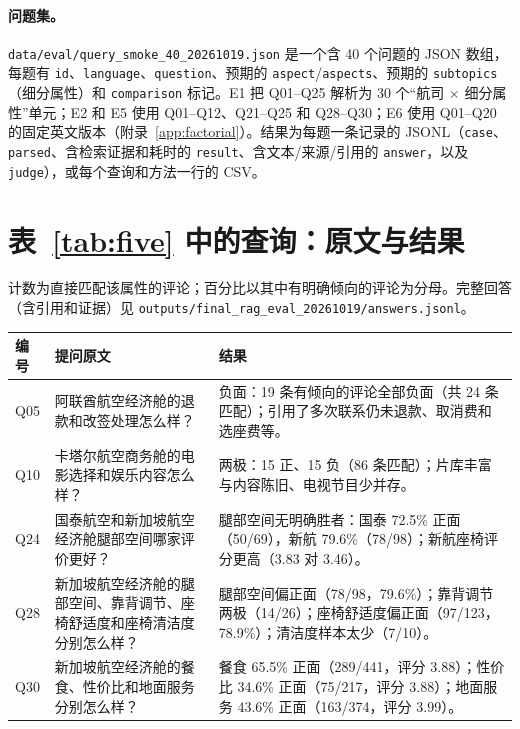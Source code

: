 \documentclass[10pt,twocolumn,a4paper]{article}
\begin{document}
\paragraph{问题集。}\nolinkurl{data/eval/query_smoke_40_20261019.json} 是一个含 40 个问题的 JSON 数组，每题有 \texttt{id}、\texttt{language}、\texttt{question}、预期的 \texttt{aspect}/\texttt{aspects}、预期的 \texttt{subtopics}（细分属性）和 \texttt{comparison} 标记。E1 把 Q01--Q25 解析为 30 个“航司 $\times$ 细分属性”单元；E2 和 E5 使用 Q01--Q12、Q21--Q25 和 Q28--Q30；E6 使用 Q01--Q20 的固定英文版本（附录~\ref{app:factorial}）。结果为每题一条记录的 JSONL（\texttt{case}、\texttt{parsed}、含检索证据和耗时的 \texttt{result}、含文本/来源/引用的 \texttt{answer}，以及 \texttt{judge}），或每个查询和方法一行的 CSV。

\section{表~\ref{tab:five} 中的查询：原文与结果}
\label{app:queries}

计数为直接匹配该属性的评论；百分比以其中有明确倾向的评论为分母。完整回答（含引用和证据）见
\nolinkurl{outputs/final_rag_eval_20261019/answers.jsonl}。

\begin{center}\small
\begin{tabularx}{\textwidth}{@{}lP{62mm}Y@{}}
\toprule
\textbf{编号} & \textbf{提问原文} & \textbf{结果} \\
\midrule
Q05 & 阿联酋航空经济舱的退款和改签处理怎么样？ & 负面：19 条有倾向的评论全部负面（共 24 条匹配）；引用了多次联系仍未退款、取消费和选座费等。 \\
Q10 & 卡塔尔航空商务舱的电影选择和娱乐内容怎么样？ & 两极：15 正、15 负（86 条匹配）；片库丰富与内容陈旧、电视节目少并存。 \\
Q24 & 国泰航空和新加坡航空经济舱腿部空间哪家评价更好？ & 腿部空间无明确胜者：国泰 72.5\% 正面（50/69），新航 79.6\%（78/98）；新航座椅评分更高（3.83 对 3.46）。 \\
Q28 & 新加坡航空经济舱的腿部空间、靠背调节、座椅舒适度和座椅清洁度分别怎么样？ & 腿部空间偏正面（78/98，79.6\%）；靠背调节两极（14/26）；座椅舒适度偏正面（97/123，78.9\%）；清洁度样本太少（7/10）。 \\
Q30 & 新加坡航空经济舱的餐食、性价比和地面服务分别怎么样？ & 餐食 65.5\% 正面（289/441，评分 3.88）；性价比 34.6\% 正面（75/217，评分 3.88）；地面服务 43.6\% 正面（163/374，评分 3.99）。 \\
\bottomrule
\end{tabularx}
\end{center}
\end{document}
